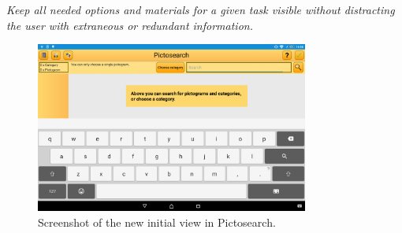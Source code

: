\begin{displayquote}
\textit{Keep all needed options and materials for a given task visible without distracting the user with extraneous or redundant information.} \cite[p.~55]{DESIGNBOOK}
\end{displayquote}

\begin{figure}[htb]
    \centering
    \includegraphics[width=0.8\textwidth]{figures/img/screenshots/new_startup.png}
    \caption{Screenshot of the new initial view in Pictosearch.}\label{fig:screenshot_newstartup}
\end{figure}


